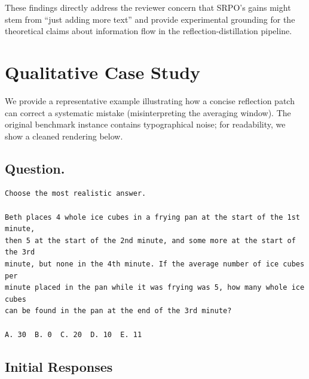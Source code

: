 \documentclass{article}
\newcommand{\method}{SRPO}
\theoremstyle{plain}
\theoremstyle{definition}
\theoremstyle{remark}
\begin{document}
These findings directly address the reviewer concern that \method{}'s gains might stem from ``just adding more text'' and provide experimental grounding for the theoretical claims about information flow in the reflection-distillation pipeline.


\newpage
\section{Qualitative Case Study}

We provide a representative example illustrating how a concise reflection patch can correct a systematic mistake (misinterpreting the averaging window). The original benchmark instance contains typographical noise; for readability, we show a cleaned rendering below.

\subsection{Question.}

\begin{lstlisting}
Choose the most realistic answer.

Beth places 4 whole ice cubes in a frying pan at the start of the 1st minute,
then 5 at the start of the 2nd minute, and some more at the start of the 3rd
minute, but none in the 4th minute. If the average number of ice cubes per
minute placed in the pan while it was frying was 5, how many whole ice cubes
can be found in the pan at the end of the 3rd minute?

A. 30  B. 0  C. 20  D. 10  E. 11
\end{lstlisting}

\subsection{Initial Responses}
\end{document}
